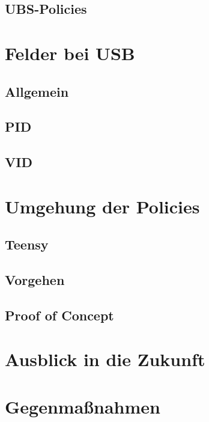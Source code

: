 \documentclass[a4paper,11pt,DIV=11,BROC=5mm,bigheadings,idxtotoc,cleardoubleempty,halfparskip,oneside,openright]{scrreprt} %
\begin{document}
			\section{UBS-Policies}
						
			
			\chapter{Felder bei USB}
			\section{Allgemein}
			\section{PID}
			\section{VID}
			
			\chapter{Umgehung der Policies}
			\section{Teensy}
			\section{Vorgehen}
			\section{Proof of Concept}

			\chapter{Ausblick in die Zukunft}			
			
			\chapter{Gegenmaßnahmen}
	
			
			
			
			
			\newpage
		
	
\end{document}

